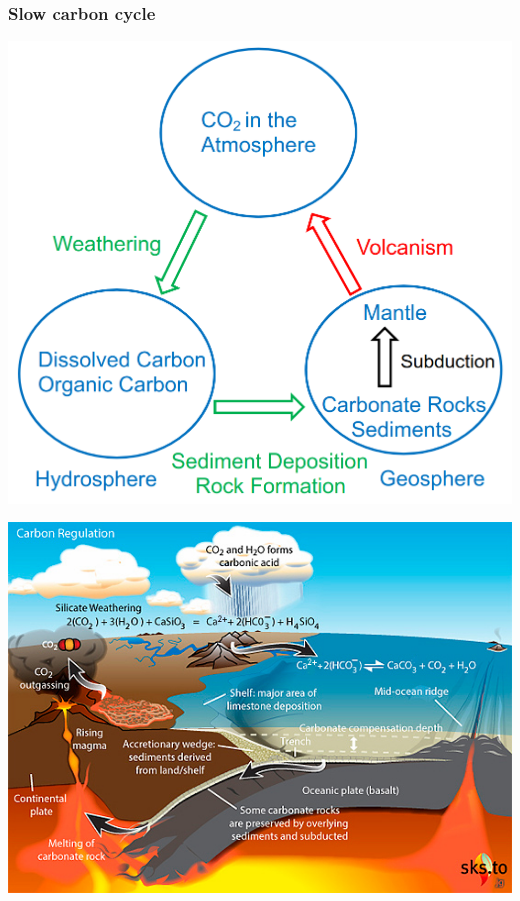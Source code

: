 \documentclass[11pt]{article}
\begin{document}
\subsubsection{Slow carbon cycle}
\label{sec:orgd0a1500}
\begin{center}
\includegraphics[scale=0.6]{./images/slow-carbon-cycle-diagram.png}
\end{center}

\begin{center}
\includegraphics[width=.9\linewidth]{./images/slow-carbon-cycle-picture.jpg}
\end{center}
\end{document}
